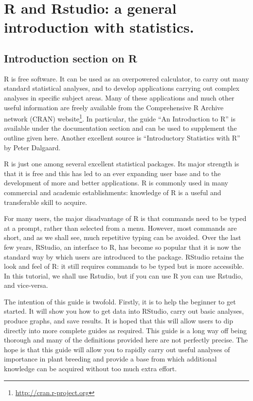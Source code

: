 \documentclass[
]{book}
\renewcommand{\href}[2]{#2\footnote{\url{#1}}}
\begin{document}
\hypertarget{R-and-stats}{%
\chapter{R and Rstudio: a general introduction with statistics.}\label{R-and-stats}}

\hypertarget{introduction-section-on-r}{%
\section{Introduction section on R}\label{introduction-section-on-r}}

R is free software. It can be used as an overpowered calculator, to carry out many standard statistical analyses, and to develop applications carrying out complex analyses in specific subject areas. Many of these applications and much other useful information are freely available from the Comprehensive R Archive network (CRAN) \href{http://cran.r-project.org}{website}. In particular, the guide ``An Introduction to R'' is available under the documentation section and can be used to supplement the outline given here. Another excellent source is ``Introductory Statistics with R'' by Peter Dalgaard.

R is just one among several excellent statistical packages. Its major strength is that it is free and this has led to an ever expanding user base and to the development of more and better applications. R is commonly used in many commercial and academic establishments: knowledge of R is a useful and transferable skill to acquire.

For many users, the major disadvantage of R is that commands need to be typed at a prompt, rather than selected from a menu. However, most commands are short, and as we shall see, much repetitive typing can be avoided. Over the last few years, RStudio, an interface to R, has become so popular that it is now the standard way by which users are introduced to the package. RStudio retains the look and feel of R: it still requires commands to be typed but is more accessible. In this tutorial, we shall use Rstudio, but if you can use R you can use Rstudio, and vice-versa.

The intention of this guide is twofold. Firstly, it is to help the beginner to get started. It will show you how to get data into RStudio, carry out basic analyses, produce graphs, and save results. It is hoped that this will allow users to dip directly into more complete guides as required. This guide is a long way off being thorough and many of the definitions provided here are not perfectly precise. The hope is that this guide will allow you to rapidly carry out useful analyses of importance in plant breeding and provide a base from which additional knowledge can be acquired without too much extra effort.
\end{document}
